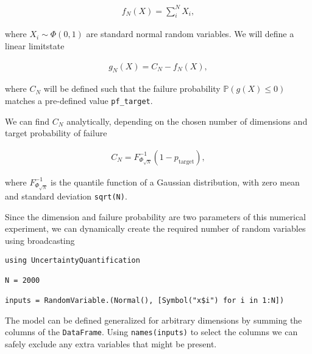 \begin{equation*}
\begin{split}f_N(X) = \sum^N_i X_i,\end{split}\end{equation*}


where \(X_i \sim \Phi(0, 1)\) are standard normal random variables. We will define a linear limitstate



\begin{equation*}
\begin{split}g_N(X) = C_N - f_N(X),\end{split}\end{equation*}


where \(C_N\) will be defined such that the failure probability \(\mathbb{P}(g(X) \leq 0)\) matches a pre-defined value \texttt{pf\_target}.



We can find \(C_N\) analytically, depending on the chosen number of dimensions and target probability of failure



\begin{equation*}
\begin{split}C_N = F_{\Phi_{\sqrt{N}}}^{-1}(1 - p_{\text{target}}),\end{split}\end{equation*}


where \(F_{\Phi_{\sqrt{N}}}^{-1}\) is the quantile function of a Gaussian distribution, with zero mean and standard deviation \texttt{sqrt(N)}.



Since the dimension and failure probability are two parameters of this numerical experiment, we can dynamically create the required number of random variables using broadcasting




\begin{verbatim}
using UncertaintyQuantification

N = 2000

inputs = RandomVariable.(Normal(), [Symbol("x$i") for i in 1:N])

\end{verbatim}



The model can be defined generalized for arbitrary dimensions by summing the columns of the \texttt{DataFrame}. Using \texttt{names(inputs)} to select the columns we can safely exclude any extra variables that might be present.




